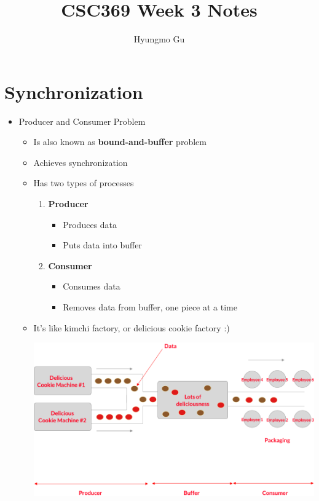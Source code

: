 \documentclass[12pt]{article}
\begin{document}
\title{CSC369 Week 3 Notes}
\author{Hyungmo Gu}
\maketitle

\bigskip

\section{Synchronization}

\bigskip
\begin{itemize}
    \item Producer and Consumer Problem
    \begin{itemize}
        \item Is also known as \textbf{bound-and-buffer} problem
        \item Achieves synchronization
        \item Has two types of processes
        \begin{enumerate}[1.]
            \item \textbf{Producer}
            \begin{itemize}
                \item Produces data
                \item Puts data into buffer
            \end{itemize}
            \item \textbf{Consumer}
            \begin{itemize}
                \item Consumes data
                \item Removes data from buffer, one piece at a time
            \end{itemize}
        \end{enumerate}
        \item It's like kimchi factory, or delicious cookie factory :)

        \begin{center}
        \includegraphics[width=\linewidth]{../images/week_3_notes_1_1.png}
        \end{center}
    \end{itemize}


\end{itemize}
\end{document}
